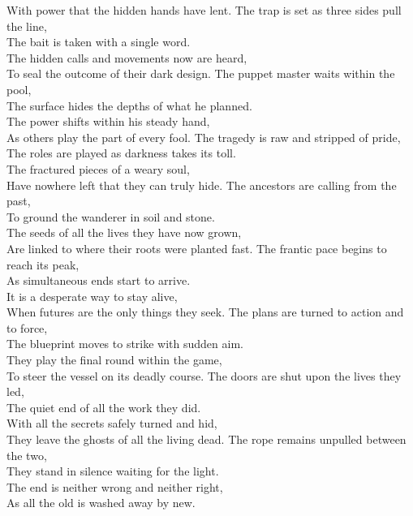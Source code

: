 \begin{lyrics}
With power that the hidden hands have lent.
The trap is set as three sides pull the line,\\
The bait is taken with a single word.\\
The hidden calls and movements now are heard,\\
To seal the outcome of their dark design.
The puppet master waits within the pool,\\
The surface hides the depths of what he planned.\\
The power shifts within his steady hand,\\
As others play the part of every fool.
The tragedy is raw and stripped of pride,\\
The roles are played as darkness takes its toll.\\
The fractured pieces of a weary soul,\\
Have nowhere left that they can truly hide.
The ancestors are calling from the past,\\
To ground the wanderer in soil and stone.\\
The seeds of all the lives they have now grown,\\
Are linked to where their roots were planted fast.
The frantic pace begins to reach its peak,\\
As simultaneous ends start to arrive.\\
It is a desperate way to stay alive,\\
When futures are the only things they seek.
The plans are turned to action and to force,\\
The blueprint moves to strike with sudden aim.\\
They play the final round within the game,\\
To steer the vessel on its deadly course.
The doors are shut upon the lives they led,\\
The quiet end of all the work they did.\\
With all the secrets safely turned and hid,\\
They leave the ghosts of all the living dead.
The rope remains unpulled between the two,\\
They stand in silence waiting for the light.\\
The end is neither wrong and neither right,\\
As all the old is washed away by new.
\end{lyrics}

